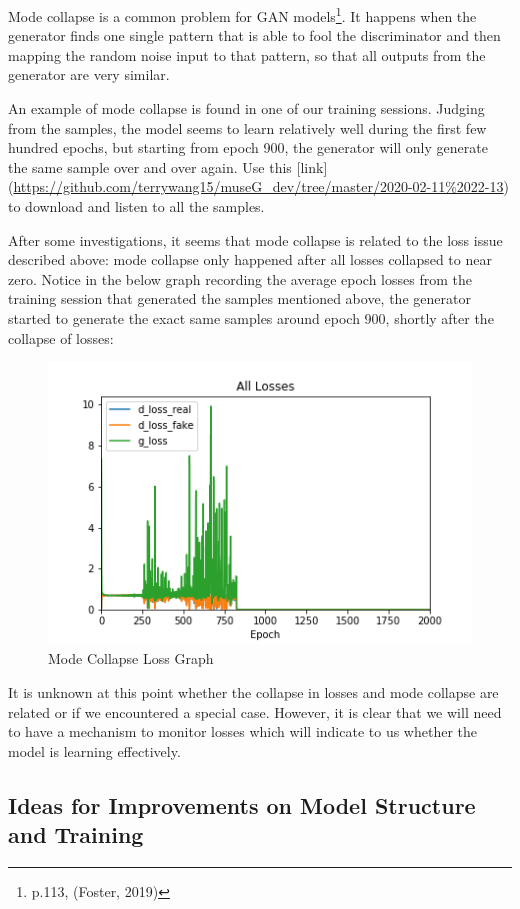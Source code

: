 \documentclass[12pt,oneside]{chicagocapstone}
\begin{document}
Mode collapse is a common problem for GAN models\footnote{p.113, (Foster, 2019)}. It happens when the generator finds one single pattern that is able to fool the discriminator and then mapping the random noise input to that pattern, so that all outputs from the generator are very similar.

An example of mode collapse is found in one of our training sessions. Judging from the samples, the model seems to learn relatively well during the first few hundred epochs, but starting from epoch 900, the generator will only generate the same sample over and over again. Use this {[}link{]} (\url{https://github.com/terrywang15/museG_dev/tree/master/2020-02-11\%2022-13}) to download and listen to all the samples.

After some investigations, it seems that mode collapse is related to the loss issue described above: mode collapse only happened after all losses collapsed to near zero. Notice in the below graph recording the average epoch losses from the training session that generated the samples mentioned above, the generator started to generate the exact same samples around epoch 900, shortly after the collapse of losses:
\begin{figure}

{\centering \includegraphics[width=0.3\linewidth]{figure/all_losses_2} 

}

\caption{Mode Collapse Loss Graph}\label{fig:unnamed-chunk-9}
\end{figure}
It is unknown at this point whether the collapse in losses and mode collapse are related or if we encountered a special case. However, it is clear that we will need to have a mechanism to monitor losses which will indicate to us whether the model is learning effectively.

\hypertarget{ideas-for-improvements-on-model-structure-and-training}{%
\subsection*{Ideas for Improvements on Model Structure and Training}\label{ideas-for-improvements-on-model-structure-and-training}}
\end{document}
